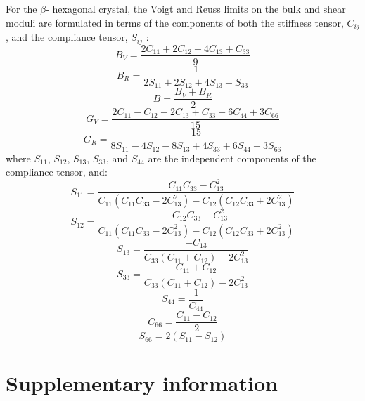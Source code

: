 \documentclass[preprint, 12pt]{elsarticle}
\begin{document}
For the $\beta$- hexagonal crystal, the Voigt and Reuss limits on the bulk and shear moduli are formulated in terms of the components of both the stiffness tensor, $C_{ij}$, and the compliance tensor, $S_{ij}$ \cite{Anderson1963, Rosinger1979}:
\begin{equation}
B_V = \frac{2 C_{11} + 2 C_{12} + 4 C_{13} + C_{33}}{9}
\end{equation}
\begin{equation}
B_R = \frac{1}{2 S_{11} + 2 S_{12} + 4 S_{13} + S_{33}}
\end{equation}
\begin{equation}
B = \frac{B_V + B_R}{2}
\end{equation}
\begin{equation}
G_V = \frac{2 C_{11} - C_{12} - 2 C_{13} + C_{33} + 6 C_{44} + 3 C_{66}}{15}
\end{equation}
\begin{equation}
G_R = \frac{15}{8 S_{11} - 4 S_{12} - 8 S_{13} + 4 S_{33} + 6 S_{44} + 3 S_{66}}
\end{equation}
where $S_{11}$, $S_{12}$, $S_{13}$, $S_{33}$, and $S_{44}$ are the independent components of the compliance tensor, and:
\begin{equation}
S_{11} = \frac{C_{11} C_{33} - C_{13}^2}{C_{11} \left( C_{11} C_{33} - 2 C_{13}^2 \right) - C_{12} \left( C_{12} C_{33} + 2 C_{13}^2 \right)}
\end{equation}
\begin{equation}
S_{12} = \frac{- C_{12} C_{33} + C_{13}^2}{C_{11} \left( C_{11} C_{33} - 2 C_{13}^2 \right) - C_{12} \left( C_{12} C_{33} + 2 C_{13}^2 \right)}
\end{equation}
\begin{equation}
S_{13} = \frac{-C_{13}}{C_{33} \left( C_{11}+C_{12} \right) - 2 C_{13}^2}
\end{equation}
\begin{equation}
S_{33} = \frac{C_{11} + C_{12}}{C_{33} \left( C_{11}+C_{12} \right) - 2 C_{13}^2}
\end{equation}
\begin{equation}
S_{44} = \frac{1}{C_{44}}
\end{equation}
\begin{equation}
C_{66} = \frac{C_{11} - C_{12}}{2}
\end{equation}
\begin{equation}
S_{66} = 2 (S_{11} - S_{12})
\end{equation}

\section{Supplementary information}
\label{app}
\end{document}
